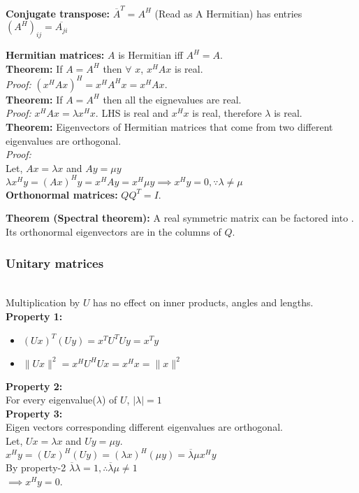 \textbf{Conjugate transpose:} $\overline{A}^T = A^H$ (Read as A Hermitian) has entries $(A^H)_{ij} = \overline {A_{ji}}$

\textbf{Hermitian matrices:} $A$ is Hermitian iff $A^H = A$.\\

\textbf{Theorem:} If $A = A^H$ then $\forall$ $x$, $x^HAx$ is real.\\
\textit{Proof:} $(x^HAx)^H = x^HA^Hx = x^HAx$.\\

\textbf{Theorem:} If $A = A^H$ then all the eignevalues are real.\\
\textit{Proof:} $x^HAx = \lambda x^Hx$. LHS is real and $x^Hx$ is real, therefore $\lambda$ is real.\\

\textbf{Theorem:} Eigenvectors of Hermitian matrices that come from two different eigenvalues are orthogonal.\\
\textit{Proof:} \\
Let, $Ax = \lambda x$ and $Ay = \mu y$\\
$\lambda x^Hy = (Ax)^Hy = x^HAy = x^H \mu y \implies x^Hy = 0, \because \lambda \neq \mu$\\

\textbf{Orthonormal matrices:} $QQ^T = I$.

\textbf{Theorem (Spectral theorem):} A real symmetric matrix can be factored into . Its orthonormal eigenvectors are in the columns of $Q$.

\subsubsection{Unitary matrices}

\\
Multiplication by $U$ has no effect on inner products, angles and lengths.\\
\textbf{Property 1:}\\
\begin{itemize}
\item $(Ux)^T(Uy) = x^TU^TUy = x^Ty$\\
\item $\|Ux\|^2 = x^HU^HUx = x^Hx = \|x\|^2$
\end{itemize}
\textbf{Property 2:}\\
For every eigenvalue($\lambda$) of $U$, $|\lambda| = 1$\\

\textbf{Property 3:}\\
Eigen vectors corresponding different eigenvalues are orthogonal.\\
Let, $Ux = \lambda x$ and $Uy = \mu y$.\\
$x^Hy = (Ux)^H(Uy) = (\lambda x)^H(\mu y) = \overline{\lambda}\mu x^Hy$\\
By property-2 $\overline{\lambda}\lambda = 1, \therefore \overline{\lambda}\mu \neq 1$\\
$\implies x^Hy = 0$.

